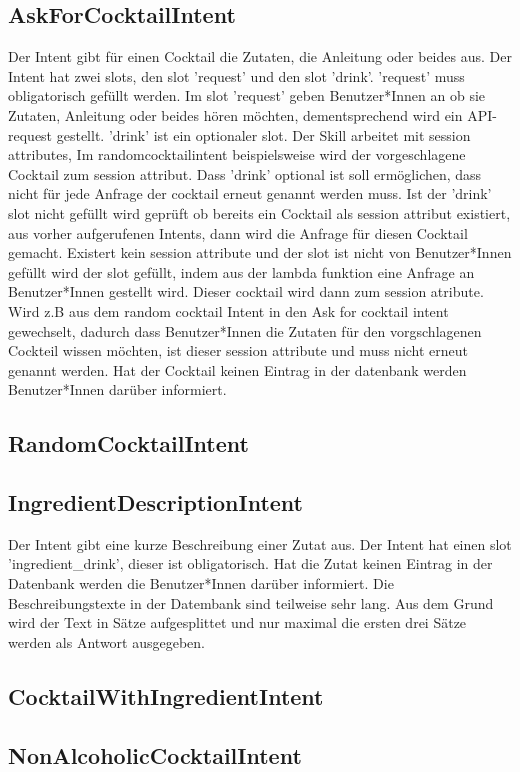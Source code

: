 \documentclass[12pt,letterpaper]{article}
\begin{document}
\subsection{AskForCocktailIntent}
Der Intent gibt für einen Cocktail die Zutaten, die Anleitung oder beides aus.
Der Intent hat zwei slots, den slot 'request' und den slot 'drink'. 'request' muss obligatorisch gefüllt werden. Im slot 'request' geben Benutzer*Innen an ob sie Zutaten, Anleitung oder beides hören möchten, dementsprechend wird ein API-request gestellt. 'drink' ist ein optionaler slot. Der Skill arbeitet mit session attributes, Im randomcocktailintent beispielsweise wird der vorgeschlagene Cocktail zum session attribut. Dass 'drink' optional ist soll ermöglichen, dass nicht für jede Anfrage der cocktail erneut genannt werden muss. Ist der 'drink' slot nicht gefüllt wird geprüft ob bereits ein Cocktail als session attribut existiert, aus vorher aufgerufenen Intents, dann wird die Anfrage für diesen Cocktail gemacht. Existert kein session attribute und der slot ist nicht von Benutzer*Innen gefüllt wird der slot gefüllt, indem aus der lambda funktion eine Anfrage an Benutzer*Innen gestellt wird. Dieser cocktail wird dann zum session atribute. Wird z.B aus dem random cocktail Intent in den Ask for cocktail intent gewechselt, dadurch dass Benutzer*Innen die Zutaten für den vorgschlagenen Cockteil wissen möchten, ist dieser session attribute und muss nicht erneut genannt werden.
Hat der Cocktail keinen Eintrag in der datenbank werden Benutzer*Innen darüber informiert.
\subsection{RandomCocktailIntent}
\subsection{IngredientDescriptionIntent}
Der Intent gibt eine kurze Beschreibung einer Zutat aus. Der Intent hat einen slot 'ingredient\_drink', dieser ist obligatorisch. Hat die Zutat keinen Eintrag in der Datenbank werden die Benutzer*Innen darüber informiert. Die Beschreibungstexte in der Datembank sind teilweise sehr lang. Aus dem Grund wird der Text in Sätze aufgesplittet und nur maximal die ersten drei Sätze werden als Antwort ausgegeben.
\subsection{CocktailWithIngredientIntent}
\subsection{NonAlcoholicCocktailIntent}
\end{document}
